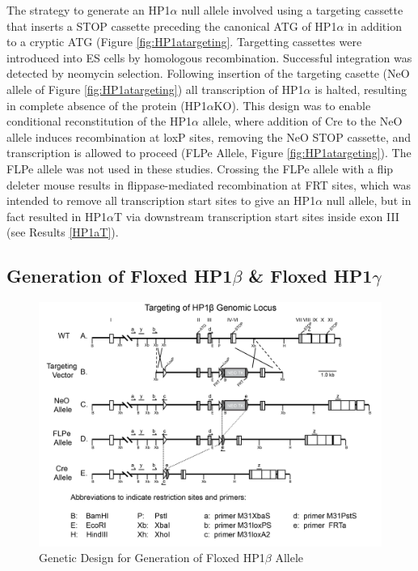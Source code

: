 \documentclass[onehalf,12pt]{beavtex}
\begin{document}
  The strategy to generate an HP1\(\alpha\) null allele involved using a
  targeting cassette that inserts a STOP cassette preceding the canonical
  ATG of HP1\(\alpha\) in addition to a cryptic ATG (Figure
  \ref{fig:HP1atargeting}. Targetting cassettes were introduced into ES
  cells by homologous recombination. Successful integration was detected
  by neomycin selection. Following insertion of the targeting casette (NeO
  allele of Figure \ref{fig:HP1atargeting}) all transcription of
  HP1\(\alpha\) is halted, resulting in complete absence of the protein
  (HP1\(\alpha\)KO). This design was to enable conditional reconstitution
  of the HP1\(\alpha\) allele, where addition of Cre to the NeO allele
  induces recombination at loxP sites, removing the NeO STOP cassette, and
  transcription is allowed to proceed (FLPe Allele, Figure
  \ref{fig:HP1atargeting}). The FLPe allele was not used in these studies.
  Crossing the FLPe allele with a flip deleter mouse results in
  flippase-mediated recombination at FRT sites, which was intended to
  remove all transcription start sites to give an HP1\(\alpha\) null
  allele, but in fact resulted in HP1\(\alpha\)T via downstream
  transcription start sites inside exon III (see Results \ref{HP1aT}).
  
  \subsection{\texorpdfstring{Generation of Floxed HP1\(\beta\) \& Floxed
  HP1\(\gamma\)}{Generation of Floxed HP1\textbackslash{}beta \& Floxed HP1\textbackslash{}gamma}}\label{HP1Bgtarget}
  
  \begin{figure}
  
  {\centering \includegraphics[width=1\linewidth]{./data/methods/HP1BTargeting} 
  
  }
  
  \caption[Genetic Design for Generation of Floxed HP1$\beta$ Allele]{Genetic Design for Generation of Floxed HP1$\beta$ Allele}\label{fig:HP1Btargeting}
  \end{figure}
  
\end{document}
